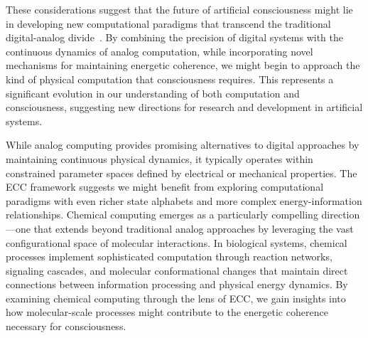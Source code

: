 These considerations suggest that the future of artificial consciousness might lie in developing new computational paradigms that transcend the traditional digital-analog divide~\cite{Davies2018, Furber2017}. By combining the precision of digital systems with the continuous dynamics of analog computation, while incorporating novel mechanisms for maintaining energetic coherence, we might begin to approach the kind of physical computation that consciousness requires. This represents a significant evolution in our understanding of both computation and consciousness, suggesting new directions for research and development in artificial systems.

While analog computing provides promising alternatives to digital approaches by maintaining continuous physical dynamics, it typically operates within constrained parameter spaces defined by electrical or mechanical properties. The ECC framework suggests we might benefit from exploring computational paradigms with even richer state alphabets and more complex energy-information relationships. Chemical computing emerges as a particularly compelling direction—one that extends beyond traditional analog approaches by leveraging the vast configurational space of molecular interactions. In biological systems, chemical processes implement sophisticated computation through reaction networks, signaling cascades, and molecular conformational changes that maintain direct connections between information processing and physical energy dynamics. By examining chemical computing through the lens of ECC, we gain insights into how molecular-scale processes might contribute to the energetic coherence necessary for consciousness.
